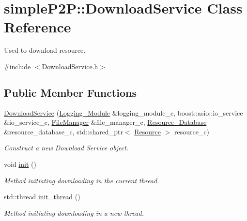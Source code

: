 \hypertarget{classsimpleP2P_1_1DownloadService}{}\section{simple\+P2P\+:\+:Download\+Service Class Reference}
\label{classsimpleP2P_1_1DownloadService}


Used to download resource.  




{\ttfamily \#include $<$Download\+Service.\+h$>$}

\subsection*{Public Member Functions}
\begin{DoxyCompactItemize}
\item 
\hyperlink{classsimpleP2P_1_1DownloadService_a4f27a3ebe460bae5dde722f8d00385fe}{Download\+Service} (\hyperlink{classsimpleP2P_1_1Logging__Module}{Logging\+\_\+\+Module} \&logging\+\_\+module\+\_\+c, boost\+::asio\+::io\+\_\+service \&io\+\_\+service\+\_\+c, \hyperlink{classsimpleP2P_1_1FileManager}{File\+Manager} \&file\+\_\+manager\+\_\+c, \hyperlink{classsimpleP2P_1_1Resource__Database}{Resource\+\_\+\+Database} \&resource\+\_\+database\+\_\+c, std\+::shared\+\_\+ptr$<$ \hyperlink{classsimpleP2P_1_1Resource}{Resource} $>$ resource\+\_\+c)
\begin{DoxyCompactList}\small\item\em Construct a new Download Service object. \end{DoxyCompactList}\item 
\mbox{\label{classsimpleP2P_1_1DownloadService_ab16e0deab0bba9b03a251a3ff5af114c}} 
void \hyperlink{classsimpleP2P_1_1DownloadService_ab16e0deab0bba9b03a251a3ff5af114c}{init} ()
\begin{DoxyCompactList}\small\item\em Method initiating downloading in the current thread. \end{DoxyCompactList}\item 
std\+::thread \hyperlink{classsimpleP2P_1_1DownloadService_a420979e6932be2f09bcc2b34e7ac8b7a}{init\+\_\+thread} ()
\begin{DoxyCompactList}\small\item\em Method initiating downloading in a new thread. \end{DoxyCompactList}\end{DoxyCompactItemize}


